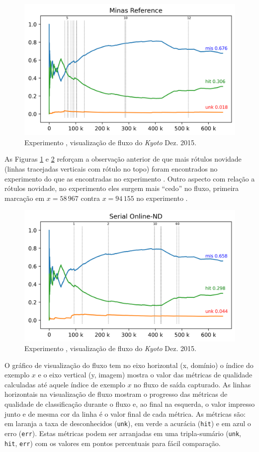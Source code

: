 \begin{figure}[htb]
  \centering
  \includegraphics[width=0.75\linewidth]{experiments/revised-java-log.png}
  \caption{Experimento \expA, visualização de fluxo do \dataset \emph{Kyoto} Dez. 2015.}
  \label{fig:validation-java}
\end{figure}

As Figuras \ref{fig:validation-java} e \ref{fig:validation-serial} reforçam a
observação anterior de que mais rótulos novidade (linhas tracejadas verticais
com rótulo no topo) foram encontrados no experimento \expA do que as encontradas 
no experimento \expB.
Outro aspecto com relação a rótulos novidade, no experimento \expA eles surgem
mais ``cedo'' no fluxo, primeira marcação em $x=58\,967$ contra $x=94\,155$ no
experimento \expB.

\begin{figure}[htb]
  \centering
  \includegraphics[width=0.75\linewidth]{experiments/online-nd-log.png}
  \caption{Experimento \expB, visualização de fluxo do \dataset \emph{Kyoto} Dez. 2015.}
  \label{fig:validation-serial}
\end{figure}

O gráfico de visualização do fluxo tem no eixo horizontal (x, domínio) o índice
do exemplo $x$ e o eixo vertical (y, imagem) mostra o valor das métricas de qualidade
calculadas até aquele índice de exemplo $x$ no fluxo de saída capturado.
As linhas horizontais na visualização de fluxo mostram o progresso das métricas
de qualidade de classificação durante o fluxo e, ao final na esquerda, o valor
impresso junto e de mesma cor da linha é o valor final de cada métrica.
As métricas são: 
em laranja a taxa de desconhecidos (\texttt{unk}),
em verde a acurácia (\texttt{hit}) e
em azul o erro (\texttt{err}).
Estas métricas podem ser arranjadas em uma tripla-sumário
(\texttt{unk}, \texttt{hit}, \texttt{err})
com os valores em pontos percentuais para fácil comparação.


